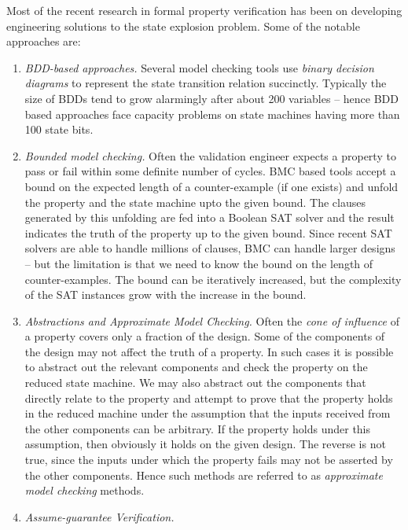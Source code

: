 Most of the recent research in formal property verification has been on
developing engineering solutions to the state explosion problem. Some of the
notable approaches are:
\begin{enumerate}

\item {\em BDD-based approaches.} Several model checking tools use {\em binary
	decision diagrams} to represent the state transition relation
	succinctly. Typically the size of BDDs tend to grow alarmingly
	after about 200 variables -- hence BDD based approaches face capacity
	problems on state machines having more than 100 state bits.

\item {\em Bounded model checking.} Often the validation engineer expects
	a property to pass or fail within some definite number of cycles.
	BMC based tools accept a bound on the expected length of a 
	counter-example (if one exists) and unfold the property and the
	state machine upto the given bound. The clauses generated by this
	unfolding are fed into a Boolean SAT solver and the result indicates
	the truth of the property up to the given bound. Since recent SAT
	solvers are able to handle millions of clauses, BMC can handle
	larger designs -- but the limitation is that we need to know the
	bound on the length of counter-examples. The bound can be iteratively
	increased, but the complexity of the SAT instances grow with the
	increase in the bound.

\item {\em Abstractions and Approximate Model Checking.} Often the {\em cone of
	influence} of a property covers only a fraction of the design. Some
	of the components of the design may not affect the truth of a property.
	In such cases it is possible to abstract out the relevant components
	and check the property on the reduced state machine. We may also
	abstract out the components that directly relate to the property
	and attempt to prove that the property holds in the reduced machine
	under the assumption that the inputs received from the other 
	components can be arbitrary. If the property holds under this 
	assumption, then obviously it holds on the given design. The reverse
	is not true, since the inputs under which the property fails may not
	be asserted by the other components. Hence such methods are referred
	to as {\em approximate model checking} methods.

\item {\em Assume-guarantee Verification.} 


\end{enumerate}
